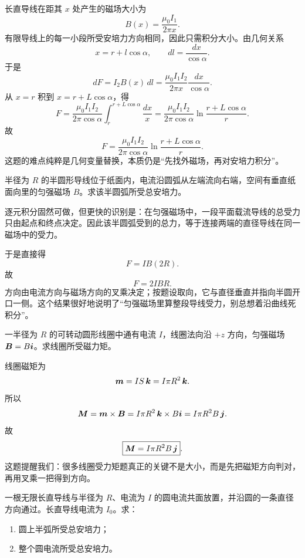 \documentclass[lang=cn,11pt]{elegantbook}
\begin{document}
\begin{solution}
长直导线在距其 \(x\) 处产生的磁场大小为
\[
B(x)=\frac{\mu_0I_1}{2\pi x}.
\]
有限导线上的每一小段所受安培力方向相同，因此只需积分大小。由几何关系
\[
x=r+l\cos\alpha,
\qquad
dl=\frac{dx}{\cos\alpha}.
\]
于是
\[
dF=I_2B(x)\,dl
=\frac{\mu_0I_1I_2}{2\pi x}\frac{dx}{\cos\alpha}.
\]
从 \(x=r\) 积到 \(x=r+L\cos\alpha\)，得
\[
F=\frac{\mu_0I_1I_2}{2\pi\cos\alpha}\int_r^{r+L\cos\alpha}\frac{dx}{x}
=\frac{\mu_0I_1I_2}{2\pi\cos\alpha}\ln\frac{r+L\cos\alpha}{r}.
\]
故
\[
\boxed{
F=\frac{\mu_0I_1I_2}{2\pi\cos\alpha}\ln\frac{r+L\cos\alpha}{r}
}.
\]
这题的难点纯粹是几何变量替换，本质仍是“先找外磁场，再对安培力积分”。
\end{solution}

\begin{example}[半圆形载流导线在匀强磁场中的受力]
半径为 \(R\) 的半圆形导线位于纸面内，电流沿圆弧从左端流向右端，空间有垂直纸面向里的匀强磁场 \(B\)。求该半圆弧所受总安培力。
\end{example}

\begin{solution}
逐元积分固然可做，但更快的识别是：在匀强磁场中，一段平面载流导线的总受力只由起点和终点决定。因此该半圆弧受到的总力，等于连接两端的直径导线在同一磁场中的受力。

于是直接得
\[
F=IB(2R).
\]
故
\[
\boxed{F=2IBR}.
\]
方向由电流方向与磁场方向的叉乘决定；按题设取向，它与直径垂直并指向半圆开口一侧。这个结果很好地说明了“匀强磁场里算整段导线受力，别总想着沿曲线死积分”。
\end{solution}

\begin{example}[圆形线圈在指定坐标系中的磁力矩方向]
一半径为 \(R\) 的可转动圆形线圈中通有电流 \(I\)，线圈法向沿 \(+z\) 方向，匀强磁场 \(\vb*{B}=B\vb*{i}\)。求线圈所受磁力矩。
\end{example}

\begin{solution}
线圈磁矩为
\[
\vb*{m}=IS\,\vb*{k}=I\pi R^2\,\vb*{k}.
\]
所以
\[
\vb*{M}=\vb*{m}\times \vb*{B}
=I\pi R^2\,\vb*{k}\times B\vb*{i}
=I\pi R^2B\,\vb*{j}.
\]
故
\[
\boxed{\vb*{M}=I\pi R^2B\,\vb*{j}}.
\]
这题提醒我们：很多线圈受力矩题真正的关键不是大小，而是先把磁矩方向判对，再用叉乘一把得到方向。
\end{solution}

\begin{example}[圆电流与共面长直导线间的安培力]
一根无限长直导线与半径为 \(R\)、电流为 \(I\) 的圆电流共面放置，并沿圆的一条直径方向通过。长直导线电流为 \(I_0\)。求：
\begin{enumerate}
  \item 圆上半弧所受总安培力；
  \item 整个圆电流所受总安培力。
\end{enumerate}
\end{example}
\end{document}
